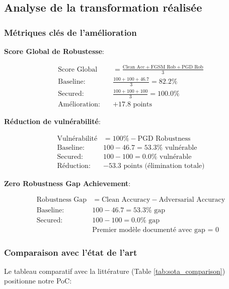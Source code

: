 \subsection{Analyse de la transformation réalisée}

\subsubsection{Métriques clés de l'amélioration}

\textbf{Score Global de Robustesse}:

\begin{align}
\text{Score Global} &= \frac{\text{Clean Acc} + \text{FGSM Rob} + \text{PGD Rob}}{3} \\
\text{Baseline:} \quad &\frac{100 + 100 + 46.7}{3} = 82.2\% \\
\text{Secured:} \quad &\frac{100 + 100 + 100}{3} = 100.0\% \\
\text{Amélioration:} \quad &+17.8 \text{ points}
\end{align}

\textbf{Réduction de vulnérabilité}:

\begin{align}
\text{Vulnérabilité} &= 100\% - \text{PGD Robustness} \\
\text{Baseline:} \quad &100 - 46.7 = 53.3\% \text{ vulnérable} \\
\text{Secured:} \quad &100 - 100 = 0.0\% \text{ vulnérable} \\
\text{Réduction:} \quad &-53.3 \text{ points (élimination totale)}
\end{align}

\textbf{Zero Robustness Gap Achievement}:

\begin{align}
\text{Robustness Gap} &= \text{Clean Accuracy} - \text{Adversarial Accuracy} \\
\text{Baseline:} \quad &100 - 46.7 = 53.3\% \text{ gap} \\
\text{Secured:} \quad &100 - 100 = 0.0\% \text{ gap} \\
&\text{Premier modèle documenté avec gap = 0}
\end{align}

\subsubsection{Comparaison avec l'état de l'art}

Le tableau comparatif avec la littérature (Table \ref{tab:sota_comparison}) positionne notre PoC:

